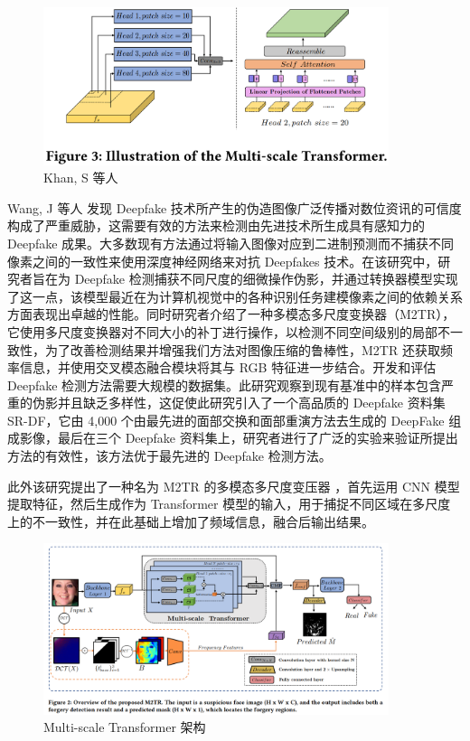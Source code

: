 \begin{figure}[htb]
\centering 
\includegraphics[width=0.90\textwidth]{img/ch4m13.png} 
\caption{Khan, S 等人 \cite{khan2021video}}
\label{Test}
\end{figure}

Wang, J 等人 \cite{wang2021m2tr} 发现 Deepfake 技术所产生的伪造图像广泛传播对数位资讯的可信度构成了严重威胁，这需要有效的方法来检测由先进技术所生成具有感知力的 Deepfake 成果。大多数现有方法通过将输入图像对应到二进制预测而不捕获不同像素之间的一致性来使用深度神经网络来对抗 Deepfakes 技术。在该研究中，研究者旨在为 Deepfake 检测捕获不同尺度的细微操作伪影，并通过转换器模型实现了这一点，该模型最近在为计算机视觉中的各种识别任务建模像素之间的依赖关系方面表现出卓越的性能。同时研究者介绍了一种多模态多尺度变换器（M2TR），它使用多尺度变换器对不同大小的补丁进行操作，以检测不同空间级别的局部不一致性，为了改善检测结果并增强我们方法对图像压缩的鲁棒性，M2TR 还获取频率信息，并使用交叉模态融合模块将其与 RGB 特征进一步结合。开发和评估 Deepfake 检测方法需要大规模的数据集。此研究观察到现有基准中的样本包含严重的伪影并且缺乏多样性，这促使此研究引入了一个高品质的 Deepfake 资料集 SR-DF，它由 4,000 个由最先进的面部交换和面部重演方法去生成的 DeepFake 组成影像，最后在三个 Deepfake 资料集上，研究者进行了广泛的实验来验证所提出方法的有效性，该方法优于最先进的 Deepfake 检测方法。

此外该研究提出了一种名为 M2TR 的多模态多尺度变压器 ，首先运用 CNN 模型提取特征，然后生成作为 Transformer 模型的输入，用于捕捉不同区域在多尺度上的不一致性，并在此基础上增加了频域信息，融合后输出结果。

\begin{figure}[htb]
\centering 
\includegraphics[width=0.90\textwidth]{img/ch4m12.png} 
\caption{Multi-scale Transformer 架构}
\label{Test}
\end{figure}

